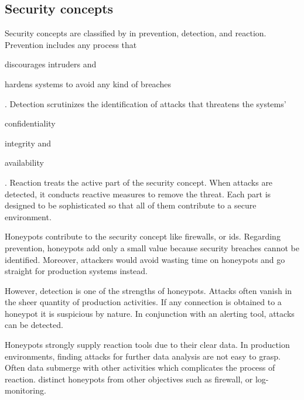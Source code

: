\subsection{Security concepts}
\label{subsec:honeypot-security-concept}

Security concepts are classified by \citet{Schneier2004} in prevention, detection, and reaction.
Prevention includes any process that
\begin{enumerate*}[label=(\roman*)]
    \item discourages intruders and
    \item hardens systems to avoid any kind of breaches
\end{enumerate*}.
Detection scrutinizes the identification of attacks that threatens the systems'
\begin{enumerate*}[label=(\roman*)]
    \item confidentiality
    \item integrity and
    \item availability
\end{enumerate*}.
Reaction treats the active part of the security concept.
When attacks are detected, it conducts reactive measures to remove the threat.
Each part is designed to be sophisticated so that all of them contribute to a secure environment. \cite{NawrockiWSKS2016}

Honeypots contribute to the security concept like firewalls, or \ac{ids}. Regarding prevention, honeypots add only a small value because security breaches cannot be identified.
Moreover, attackers would avoid wasting time on honeypots and go straight for production systems instead.

However, detection is one of the strengths of honeypots.
Attacks often vanish in the sheer quantity of production activities.
If any connection is obtained to a honeypot it is suspicious by nature.
In conjunction with an alerting tool, attacks can be detected.

Honeypots strongly supply reaction tools due to their clear data.
In production environments, finding attacks for further data analysis are not easy to grasp.
Often data submerge with other activities which complicates the process of reaction. \cite{NawrockiWSKS2016}
\citet{NawrockiWSKS2016} distinct honeypots from other objectives such as firewall, or log-monitoring.

